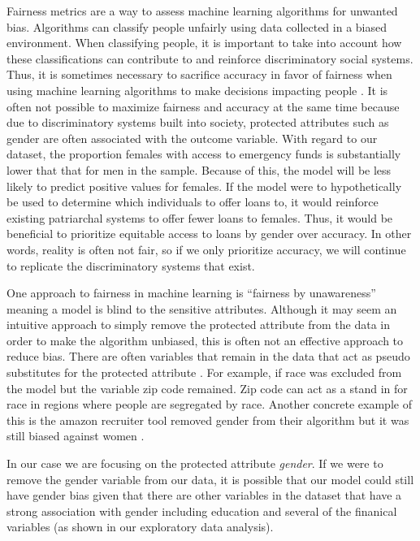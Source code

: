 \documentclass[water,article,submit,moreauthors,pdftex]{mdpi}
\begin{document}
Fairness metrics are a way to assess machine learning algorithms for
unwanted bias. Algorithms can classify people unfairly using data
collected in a biased environment. When classifying people, it is
important to take into account how these classifications can contribute
to and reinforce discriminatory social systems. Thus, it is sometimes
necessary to sacrifice accuracy in favor of fairness when using machine
learning algorithms to make decisions impacting people
\citep[\citet{kamiran2012data},
\citet{menon2018cost}]{zliobaite2015relation}. It is often not possible
to maximize fairness and accuracy at the same time because due to
discriminatory systems built into society, protected attributes such as
gender are often associated with the outcome variable. With regard to
our dataset, the proportion females with access to emergency funds is
substantially lower that that for men in the sample. Because of this,
the model will be less likely to predict positive values for females. If
the model were to hypothetically be used to determine which individuals
to offer loans to, it would reinforce existing patriarchal systems to
offer fewer loans to females. Thus, it would be beneficial to prioritize
equitable access to loans by gender over accuracy. In other words,
reality is often not fair, so if we only prioritize accuracy, we will
continue to replicate the discriminatory systems that exist.

One approach to fairness in machine learning is ``fairness by
unawareness'' meaning a model is blind to the sensitive attributes.
Although it may seem an intuitive approach to simply remove the
protected attribute from the data in order to make the algorithm
unbiased, this is often not an effective approach to reduce bias. There
are often variables that remain in the data that act as pseudo
substitutes for the protected attribute \citep{zhou2022bias}. For
example, if race was excluded from the model but the variable zip code
remained. Zip code can act as a stand in for race in regions where
people are segregated by race. Another concrete example of this is the
amazon recruiter tool removed gender from their algorithm but it was
still biased against women \citep{goodman_2022}.

In our case we are focusing on the protected attribute \emph{gender}. If
we were to remove the gender variable from our data, it is possible that
our model could still have gender bias given that there are other
variables in the dataset that have a strong association with gender
including education and several of the finanical variables (as shown in
our exploratory data analysis).
\end{document}
